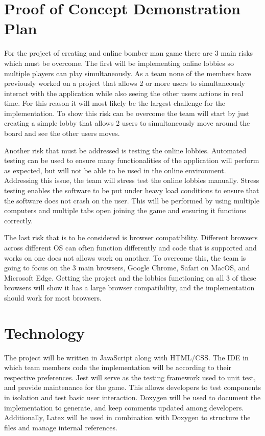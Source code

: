 \documentclass{article}
\begin{document}
\section{Proof of Concept Demonstration Plan}

For the project of creating and online bomber man game there are 3 main risks which must be overcome. The first will be implementing online lobbies so multiple players can play simultaneously. As a team none of the members have previously worked on a project that allows 2 or more users to simultaneously interact with the application while also seeing the other users actions in real time. For this reason it will most likely be the largest challenge for the implementation. To show this risk can be overcome the team will start by just creating a simple lobby that allows 2 users to simultaneously move around the board and see the other users moves.

Another risk that must be addressed is testing the online lobbies. Automated testing can be used to ensure many functionalities of the application will perform as expected, but will not be able to be used in the online environment. Addressing this issue, the team will stress test the online lobbies manually. Stress testing enables the software to be put under heavy load conditions to ensure that the software does not crash on the user. This will be performed by using multiple computers and multiple tabs open joining the game and ensuring it functions correctly.

The last risk that is to be considered is browser compatibility. Different browsers across different OS can often function differently and code that is supported and works on one does not allows work on another. To overcome this, the team is going to focus on the 3 main browsers, Google Chrome, Safari on MacOS, and Microsoft Edge. Getting the project and the lobbies functioning on all 3 of these browsers will show it has a large browser compatibility, and the implementation should work for most browsers.
 

\section{Technology}


The project will be written in JavaScript along with HTML/CSS. The IDE in which
team members code the implementation will be according to their respective preferences. Jest will serve as the testing framework used to unit test, and provide maintenance for the game. This allows developers to test components in isolation and test basic user interaction. Doxygen will be used to document the implementation to generate, and keep comments updated among developers. Additionally, Latex will be used in combination with Doxygen to structure the files and manage internal references. 
\end{document}
